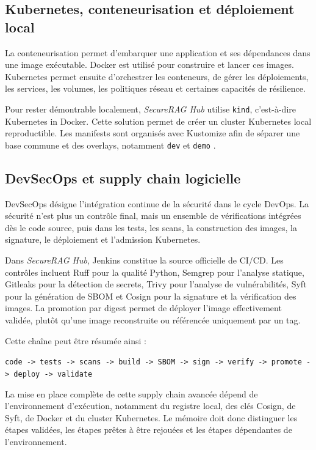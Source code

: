 \subsection{Kubernetes, conteneurisation et déploiement local}

La conteneurisation permet d'embarquer une application et ses dépendances dans une image exécutable. Docker est utilisé pour construire et lancer ces images. Kubernetes permet ensuite d'orchestrer les conteneurs, de gérer les déploiements, les services, les volumes, les politiques réseau et certaines capacités de résilience.

Pour rester démontrable localement, \textit{SecureRAG Hub} utilise \texttt{kind}, c'est-à-dire Kubernetes in Docker. Cette solution permet de créer un cluster Kubernetes local reproductible. Les manifests sont organisés avec Kustomize afin de séparer une base commune et des overlays, notamment \texttt{dev} et \texttt{demo} \cite{kubernetes_docs,kind_docs,kustomize_docs}.

\subsection{DevSecOps et supply chain logicielle}

DevSecOps désigne l'intégration continue de la sécurité dans le cycle DevOps. La sécurité n'est plus un contrôle final, mais un ensemble de vérifications intégrées dès le code source, puis dans les tests, les scans, la construction des images, la signature, le déploiement et l'admission Kubernetes.

Dans \textit{SecureRAG Hub}, Jenkins constitue la source officielle de CI/CD. Les contrôles incluent Ruff pour la qualité Python, Semgrep pour l'analyse statique, Gitleaks pour la détection de secrets, Trivy pour l'analyse de vulnérabilités, Syft pour la génération de SBOM et Cosign pour la signature et la vérification des images. La promotion par digest permet de déployer l'image effectivement validée, plutôt qu'une image reconstruite ou référencée uniquement par un tag.

Cette chaîne peut être résumée ainsi :

\begin{center}
\texttt{code -> tests -> scans -> build -> SBOM -> sign -> verify -> promote -> deploy -> validate}
\end{center}

La mise en place complète de cette supply chain avancée dépend de l'environnement d'exécution, notamment du registre local, des clés Cosign, de Syft, de Docker et du cluster Kubernetes. Le mémoire doit donc distinguer les étapes validées, les étapes prêtes à être rejouées et les étapes dépendantes de l'environnement.

